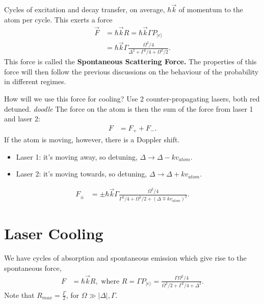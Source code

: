 \documentclass[lasers.tex]{subfiles}
\begin{document}
Cycles of excitation and decay transfer, on average, $\hbar\vec{k}$ of momentum to the atom per cycle.
This exerts a force
\begin{align}
    \vec{F} &= \hbar\vec{k}R = \hbar\vec{k}\Gamma P_{|e\rangle} \\
            &= \hbar\vec{k}\Gamma\frac{\Omega^2/4}{\Delta^2+\Gamma^2/4+\Omega^2/2}.
\end{align}
This force is called the \textbf{Spontaneous Scattering Force.}
The properties of this force will then follow the previous discussions on the behaviour of the probability in different regimes.

How will we use this force for cooling?
Use 2 counter-propagating lasers, both red detuned. 
\emph{doodle}
The force on the atom is then the sum of the force from laser 1 and laser 2:
\begin{align}
    F &= F_+ + F_-.
\end{align}
If the atom is moving, however, there is a Doppler shift. 
\begin{itemize}
    \item Laser 1: it's moving away, so detuning, $\Delta\to\Delta-kv_{atom}$.
    \item Laser 2: it's moving towards, so detuning, $\Delta\to\Delta+kv_{atom}$.
\end{itemize}
\begin{align}
    F_{\pm} &= \pm \hbar\vec{k}\Gamma\frac{\Omega^2/4}{\Gamma^2/4 + \Omega^2/2 + (\Delta\mp kv_{atom})^2}.
\end{align}

\chapter{Laser Cooling}
We have cycles of absorption and spontaneous emission which give rise to the spontaneous force,
\begin{align}
    F &= \hbar\vec{k}R, \text{ where } R = \Gamma P_{|e\rangle} = \frac{\Gamma\Omega^2/4}{\Omega^2/2 + \Gamma^2/4 + \Delta^2}.
\end{align}
Note that $R_{max}=\frac{\Gamma}{2}$, for $\Omega\gg|\Delta|,\Gamma$.
\end{document}

